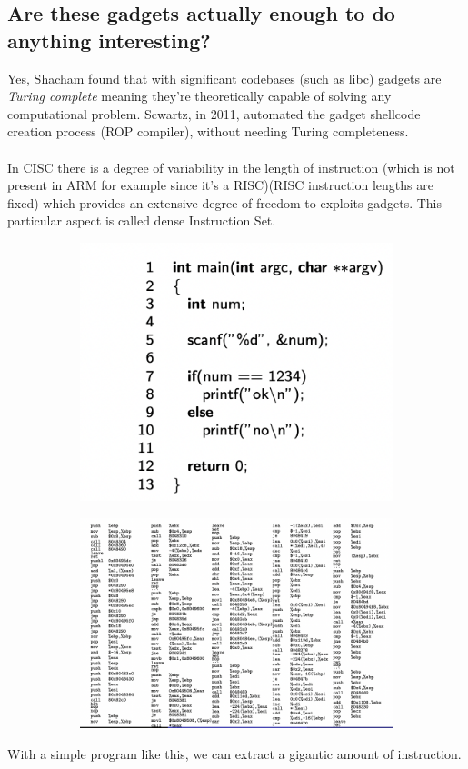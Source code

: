 \documentclass[11pt, oneside]{article}   	%
\begin{document}
\subsection*{Are these gadgets actually enough to do anything interesting?}
Yes, Shacham found that with significant codebases (such as libc) gadgets are \emph{Turing complete} meaning they're theoretically capable of solving any computational problem. Scwartz, in 2011, automated the gadget shellcode creation process (ROP compiler), without needing Turing completeness.\\\\
In CISC there is a degree of variability in the length of instruction (which is not present in ARM for example since it's a RISC)(RISC instruction lengths are fixed) which provides an extensive degree of freedom to exploits gadgets. This particular aspect is called dense Instruction Set.
\begin{figure}[H]
\begin{subfigure}[H]{0.4\linewidth}
\includegraphics[width=\linewidth]{b1}
\end{subfigure}
\begin{subfigure}[H]{0.5\linewidth}
\includegraphics[width=\linewidth]{b2}
\end{subfigure}%
\end{figure}
With a simple program like this, we can extract a gigantic amount of instruction.
\end{document}
